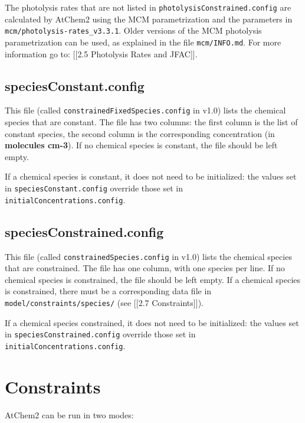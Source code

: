 The photolysis rates that are not listed in
\texttt{photolysisConstrained.config} are calculated by AtChem2 using
the MCM parametrization and the parameters in
\texttt{mcm/photolysis-rates\_v3.3.1}. Older versions of the MCM
photolysis parametrization can be used, as explained in the file
\texttt{mcm/INFO.md}. For more information go to: {[}{[}2.5 Photolysis
Rates and JFAC{]}{]}.

\subsection{speciesConstant.config} \label{subsec:speciesconstant}

This file (called \texttt{constrainedFixedSpecies.config} in v1.0)
lists the chemical species that are constant. The file has two
columns: the first column is the list of constant species, the second
column is the corresponding concentration (in \textbf{molecules
  cm-3}). If no chemical species is constant, the file should be left
empty.

If a chemical species is constant, it does not need to be initialized:
the values set in \texttt{speciesConstant.config} override those set
in \texttt{initialConcentrations.config}.

\subsection{speciesConstrained.config} \label{subsec:speciesconstrained}

This file (called \texttt{constrainedSpecies.config} in v1.0) lists
the chemical species that are constrained. The file has one column,
with one species per line. If no chemical species is constrained, the
file should be left empty. If a chemical species is constrained, there
must be a corresponding data file in
\texttt{model/constraints/species/} (see {[}{[}2.7 Constraints{]}{]}).

If a chemical species constrained, it does not need to be initialized:
the values set in \texttt{speciesConstrained.config} override those
set in \texttt{initialConcentrations.config}.

\section{Constraints} \label{sec:constraints}

AtChem2 can be run in two modes:

